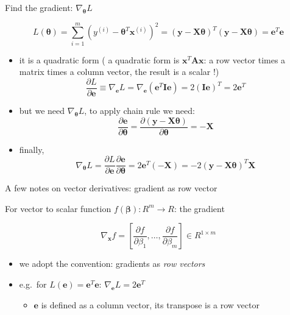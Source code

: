 \documentclass[ignorenonframetext,]{beamer}
\providecommand{\tightlist}{%
  \setlength{\itemsep}{0pt}\setlength{\parskip}{0pt}}
\newcommand{\vv}[1]{\boldsymbol{#1}}
\begin{document}
\begin{frame}{Find the gradient: \(\nabla_{\vv{\theta}}L\)}
\protect\hypertarget{find-the-gradient-nabla_vvthetal}{}

\[L(\vv{\theta}) = \sum_{i=1}^m (y^{(i)} - \vv{\theta}^T\vv{x}^{(i)})^2 = (\vv{y} -\vv{X\theta})^T(\vv{y}-\vv{X\theta}) = \vv{e}^T\vv{e}\]

\begin{itemize}
\tightlist
\item
  it is a quadratic form ( a quadratic form is
  \(\vv{x}^T \vv{A} \vv{x}\): a row vector times a matrix times a column
  vector, the result is a scalar !)
  \[\frac{\partial L}{\partial \vv{e}} \equiv \nabla_{\vv{e}} L = \nabla_{\vv{e}} (\vv{e}^T\vv{I}\vv{e}) = 2(\vv{Ie})^T = 2\vv{e}^{T}\]
\item
  but we need \(\nabla_{\vv{\theta}}L\), to apply chain rule we need:
  \[\frac{\partial \vv{e}}{\partial \vv{\theta}} = \frac{\partial (\vv{y}- \vv{X\theta})}{\partial \vv{\theta}} =-\vv{X}\]
\item
  finally,
  \[\nabla_{\vv{\theta}} L = \frac{\partial L}{\partial \vv{e}}\frac{\partial \vv{e}}{\partial \vv{\theta}} = 2\vv{e}^{T}(-\vv{X}) = -2(\vv{y}-\vv{X\theta})^{T}\vv{X} \]
\end{itemize}

\end{frame}

\begin{frame}{A few notes on vector derivatives: gradient as row vector}
\protect\hypertarget{a-few-notes-on-vector-derivatives-gradient-as-row-vector}{}

For vector to scalar function \(f(\vv{\beta}): R^m \rightarrow R\): the
gradient

\[\nabla_{\vv{x}}f = \left [\frac{\partial f}{\partial \beta_1}, \ldots, \frac{\partial f}{\partial \beta_m}\right ]\in R^{1\times m}\]

\begin{itemize}
\tightlist
\item
  we adopt the convention: gradients as \emph{row vectors}
\item
  e.g.~for \(L(\vv{e}) = \vv{e}^T\vv{e}\):
  \(\nabla_{\vv{e}} L = 2\vv{e}^{T}\)

  \begin{itemize}
  \tightlist
  \item
    \(\vv{e}\) is defined as a column vector, its transpose is a row
    vector
  \end{itemize}
\end{itemize}

\end{frame}
\end{document}
